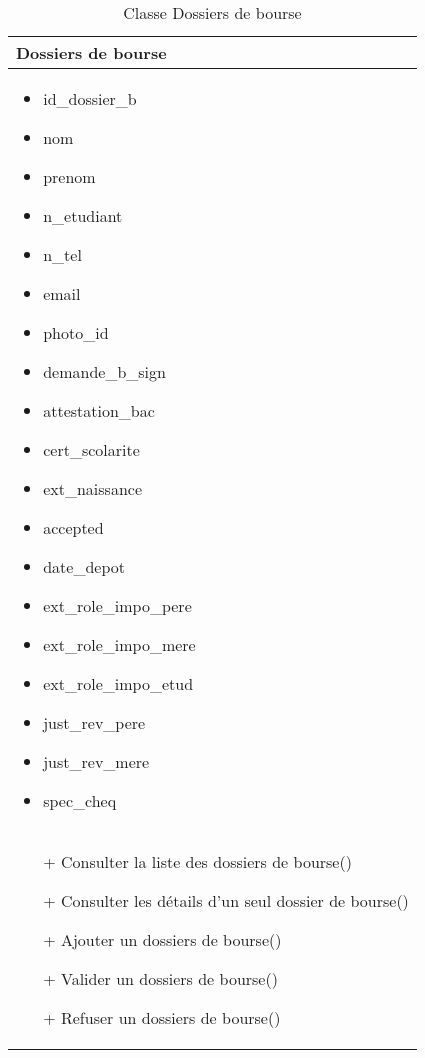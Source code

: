 \begin{table}[H]
    \begin{center}
        \begin{tabular}{|Z{5cm}|}
            \hline
            \textbf{Dossiers de bourse}\\
            \hline
            \begin{itemize}
                \item id\_dossier\_b
                \item nom
                \item prenom
                \item n\_etudiant
                \item n\_tel
                \item email
                \item photo\_id
                \item demande\_b\_sign
                \item attestation\_bac
                \item cert\_scolarite
                \item ext\_naissance
                \item accepted
                \item date\_depot
                \item ext\_role\_impo\_pere
                \item ext\_role\_impo\_mere
                \item ext\_role\_impo\_etud
                \item just\_rev\_pere
                \item just\_rev\_mere
                \item spec\_cheq
            \end{itemize}\\
            \hline
            \begin{itemize}
                \item[+] Consulter la liste des dossiers de bourse()
                \item[+] Consulter les détails d'un seul dossier de bourse()
                \item[+] Ajouter un dossiers de bourse()
                \item[+] Valider un dossiers de bourse()
                \item[+] Refuser un dossiers de bourse()
            \end{itemize}
            \\
            \hline
        \end{tabular}	
        \caption{Classe Dossiers de bourse}
    \end{center}
\end{table}


